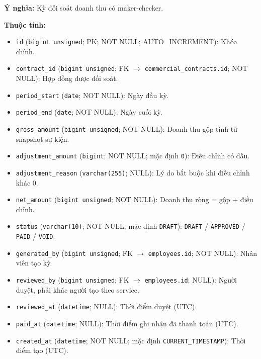 \textbf{Ý nghĩa:} Kỳ đối soát doanh thu có maker-checker.\par

\textbf{Thuộc tính:}

\begin{itemize}

\item \texttt{id} (\texttt{bigint unsigned}; PK; NOT NULL; AUTO_INCREMENT): Khóa chính.

\item \texttt{contract\_id} (\texttt{bigint unsigned}; FK $\rightarrow$ \texttt{commercial\_contracts.id}; NOT NULL): Hợp đồng được đối soát.

\item \texttt{period\_start} (\texttt{date}; NOT NULL): Ngày đầu kỳ.

\item \texttt{period\_end} (\texttt{date}; NOT NULL): Ngày cuối kỳ.

\item \texttt{gross\_amount} (\texttt{bigint unsigned}; NOT NULL): Doanh thu gộp tính từ snapshot sự kiện.

\item \texttt{adjustment\_amount} (\texttt{bigint}; NOT NULL; mặc định \texttt{0}): Điều chỉnh có dấu.

\item \texttt{adjustment\_reason} (\texttt{varchar(255)}; NULL): Lý do bắt buộc khi điều chỉnh khác 0.

\item \texttt{net\_amount} (\texttt{bigint unsigned}; NOT NULL): Doanh thu ròng = gộp + điều chỉnh.

\item \texttt{status} (\texttt{varchar(10)}; NOT NULL; mặc định \texttt{DRAFT}): \texttt{DRAFT} / \texttt{APPROVED} / \texttt{PAID} / \texttt{VOID}.

\item \texttt{generated\_by} (\texttt{bigint unsigned}; FK $\rightarrow$ \texttt{employees.id}; NOT NULL): Nhân viên tạo kỳ.

\item \texttt{reviewed\_by} (\texttt{bigint unsigned}; FK $\rightarrow$ \texttt{employees.id}; NULL): Người duyệt, phải khác người tạo theo service.

\item \texttt{reviewed\_at} (\texttt{datetime}; NULL): Thời điểm duyệt (UTC).

\item \texttt{paid\_at} (\texttt{datetime}; NULL): Thời điểm ghi nhận đã thanh toán (UTC).

\item \texttt{created\_at} (\texttt{datetime}; NOT NULL; mặc định \texttt{CURRENT\_TIMESTAMP}): Thời điểm tạo (UTC).

\end{itemize}

